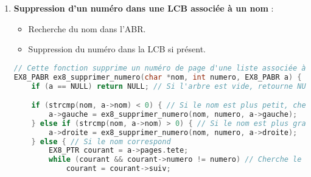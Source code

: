 \documentclass[a4paper,12pt]{article}
\begin{document}
\begin{enumerate}
\begin{lstlisting}[language=C]
// Cette fonction insère un nom propre dans un ABR, avec une liste de numéros de pages associée.
EX8_PABR ex8_ajout_nompropre(char* nom, int t[], int nombre, EX8_PABR a) {
    if (a == NULL) { // Si l'arbre est vide
        a = (EX8_PABR)malloc(sizeof(EX8_ABR)); // Alloue un nouveau nœud
        if (!a) { // Vérifie si l'allocation a échoué
            printf("Erreur d'allocation mémoire.\n");
            exit(1); // Quitte le programme en cas d'erreur
        }
        strcpy(a->nom, nom); // Copie le nom dans le nœud
        a->pages.tete = a->pages.queue = NULL; // Initialise la liste de pages

        for (int i = 0; i < nombre; i++) // Ajoute les numéros de pages à la liste
            a->pages = ex8_ajout_numero(t[i], a->pages);

        a->gauche = a->droite = NULL; // Initialise les sous-arbres gauche et droit
    } else if (strcmp(nom, a->nom) < 0) { // Si le nom est plus petit, insère dans le sous-arbre gauche
        a->gauche = ex8_ajout_nompropre(nom, t, nombre, a->gauche);
    } else if (strcmp(nom, a->nom) > 0) { // Si le nom est plus grand, insère dans le sous-arbre droit
        a->droite = ex8_ajout_nompropre(nom, t, nombre, a->droite);
    }

    return a; // Retourne l'arbre mis à jour
}
\end{lstlisting}

    \item \textbf{Suppression d'un numéro dans une LCB associée à un nom} :
    \begin{itemize}
        \item Recherche du nom dans l’ABR.
        \item Suppression du numéro dans la LCB si présent.
    \end{itemize}

\begin{lstlisting}[language=C]
// Cette fonction supprime un numéro de page d'une liste associée à un nom dans l'ABR.
EX8_PABR ex8_supprimer_numero(char *nom, int numero, EX8_PABR a) {
    if (a == NULL) return NULL; // Si l'arbre est vide, retourne NULL

    if (strcmp(nom, a->nom) < 0) { // Si le nom est plus petit, cherche dans le sous-arbre gauche
        a->gauche = ex8_supprimer_numero(nom, numero, a->gauche);
    } else if (strcmp(nom, a->nom) > 0) { // Si le nom est plus grand, cherche dans le sous-arbre droit
        a->droite = ex8_supprimer_numero(nom, numero, a->droite);
    } else { // Si le nom correspond
        EX8_PTR courant = a->pages.tete;
        while (courant && courant->numero != numero) // Cherche le numéro dans la liste
            courant = courant->suiv;


\end{lstlisting}
\end{enumerate}
\end{document}
